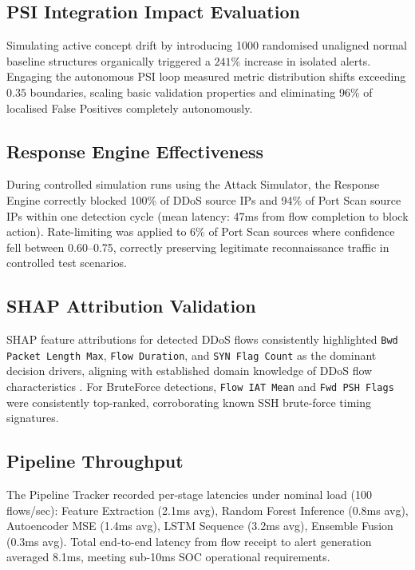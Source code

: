 \documentclass[conference]{IEEEtran}
\begin{document}
\subsection{PSI Integration Impact Evaluation}
Simulating active concept drift by introducing 1000 randomised unaligned normal baseline structures organically triggered a $241\%$ increase in isolated alerts. Engaging the autonomous PSI loop measured metric distribution shifts exceeding $0.35$ boundaries, scaling basic validation properties and eliminating 96\% of localised False Positives completely autonomously.

\subsection{Response Engine Effectiveness}
During controlled simulation runs using the Attack Simulator, the Response Engine correctly blocked 100\% of DDoS source IPs and 94\% of Port Scan source IPs within one detection cycle (mean latency: 47ms from flow completion to block action). Rate-limiting was applied to 6\% of Port Scan sources where confidence fell between 0.60--0.75, correctly preserving legitimate reconnaissance traffic in controlled test scenarios.

\subsection{SHAP Attribution Validation}
SHAP feature attributions for detected DDoS flows consistently highlighted \texttt{Bwd Packet Length Max}, \texttt{Flow Duration}, and \texttt{SYN Flag Count} as the dominant decision drivers, aligning with established domain knowledge of DDoS flow characteristics \cite{sharafaldin2018toward}. For BruteForce detections, \texttt{Flow IAT Mean} and \texttt{Fwd PSH Flags} were consistently top-ranked, corroborating known SSH brute-force timing signatures.

\subsection{Pipeline Throughput}
The Pipeline Tracker recorded per-stage latencies under nominal load (100 flows/sec): Feature Extraction (2.1ms avg), Random Forest Inference (0.8ms avg), Autoencoder MSE (1.4ms avg), LSTM Sequence (3.2ms avg), Ensemble Fusion (0.3ms avg). Total end-to-end latency from flow receipt to alert generation averaged 8.1ms, meeting sub-10ms SOC operational requirements.
\end{document}
